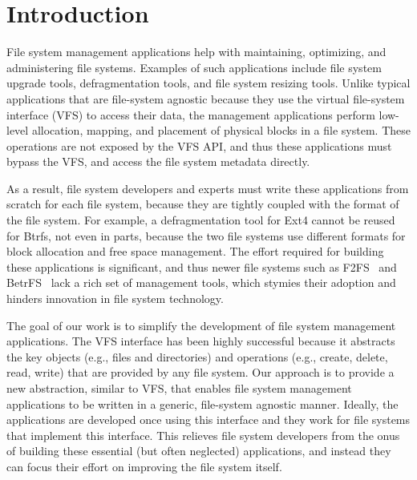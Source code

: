 \vspace{-0.7em}
\section{Introduction\label{sec:Introduction}}
\vspace{-0.4em}

File system management applications help with maintaining, optimizing, and administering file systems. Examples of such applications include file system upgrade tools, defragmentation tools, and file system resizing tools. Unlike typical applications that are file-system agnostic because they use the virtual file-system interface (VFS) to access their data, the management applications perform low-level allocation, mapping, and placement of physical blocks in a file system. These operations are not exposed by the VFS API, and thus these applications must bypass the VFS, and access the file system metadata directly.

As a result, file system developers and experts must write these applications from scratch for each file system, because they are tightly coupled with the format of the file system. For example, a defragmentation tool for Ext4 cannot be reused for Btrfs, not even in parts, because the two file systems use different formats for block allocation and free space management. The effort required for building these applications is significant, and thus newer file systems such as F2FS~\cite{lee2015f2fs} and BetrFS~\cite{betrfs-2015-tos} lack a rich set of management tools, which stymies their adoption and hinders innovation in file system technology.

The goal of our work is to simplify the development of file system management applications. The VFS interface has been highly successful because it abstracts the key objects (e.g., files and directories) and operations (e.g., create, delete, read, write) that are provided by any file system. Our approach is to provide a new abstraction, similar to VFS, that enables file system management applications to be written in a generic, file-system agnostic manner. Ideally, the applications are developed once using this interface and they work for file systems that implement this interface.  This relieves file system developers from the onus of building these essential (but often neglected) applications, and instead they can focus their effort on improving the file system itself.

